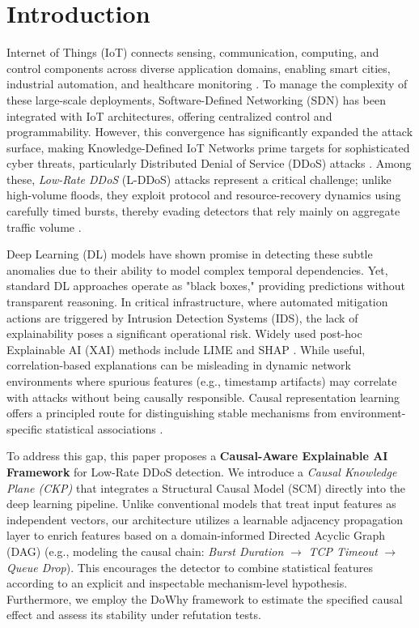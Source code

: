 \documentclass[journal]{IEEEtran}
\begin{document}
\section{Introduction}
\label{sec:introduction}

 Internet of Things (IoT) connects sensing, communication, computing, and control components across diverse application domains, enabling smart cities, industrial automation, and healthcare monitoring \cite{al-fuqaha2015iot}. To manage the complexity of these large-scale deployments, Software-Defined Networking (SDN) has been integrated with IoT architectures, offering centralized control and programmability. However, this convergence has significantly expanded the attack surface, making Knowledge-Defined IoT Networks prime targets for sophisticated cyber threats, particularly Distributed Denial of Service (DDoS) attacks \cite{yan2016sdn_ddos}. Among these, \textit{Low-Rate DDoS} (L-DDoS) attacks represent a critical challenge; unlike high-volume floods, they exploit protocol and resource-recovery dynamics using carefully timed bursts, thereby evading detectors that rely mainly on aggregate traffic volume \cite{kuzmanovic2003lowrate}.

Deep Learning (DL) models have shown promise in detecting these subtle anomalies due to their ability to model complex temporal dependencies. Yet, standard DL approaches operate as "black boxes," providing predictions without transparent reasoning. In critical infrastructure, where automated mitigation actions are triggered by Intrusion Detection Systems (IDS), the lack of explainability poses a significant operational risk. Widely used post-hoc Explainable AI (XAI) methods include LIME and SHAP \cite{ribeiro2016lime,lundberg2017shap}. While useful, correlation-based explanations can be misleading in dynamic network environments where spurious features (e.g., timestamp artifacts) may correlate with attacks without being causally responsible. Causal representation learning offers a principled route for distinguishing stable mechanisms from environment-specific statistical associations \cite{scholkopf2021causalrep}.

To address this gap, this paper proposes a \textbf{Causal-Aware Explainable AI Framework} for Low-Rate DDoS detection. We introduce a \textit{Causal Knowledge Plane (CKP)} that integrates a Structural Causal Model (SCM) directly into the deep learning pipeline. Unlike conventional models that treat input features as independent vectors, our architecture utilizes a learnable adjacency propagation layer to enrich features based on a domain-informed Directed Acyclic Graph (DAG) (e.g., modeling the causal chain: \textit{Burst Duration} $\rightarrow$ \textit{TCP Timeout} $\rightarrow$ \textit{Queue Drop}). This encourages the detector to combine statistical features according to an explicit and inspectable mechanism-level hypothesis. Furthermore, we employ the DoWhy framework \cite{sharma2020dowhy} to estimate the specified causal effect and assess its stability under refutation tests.
\end{document}
